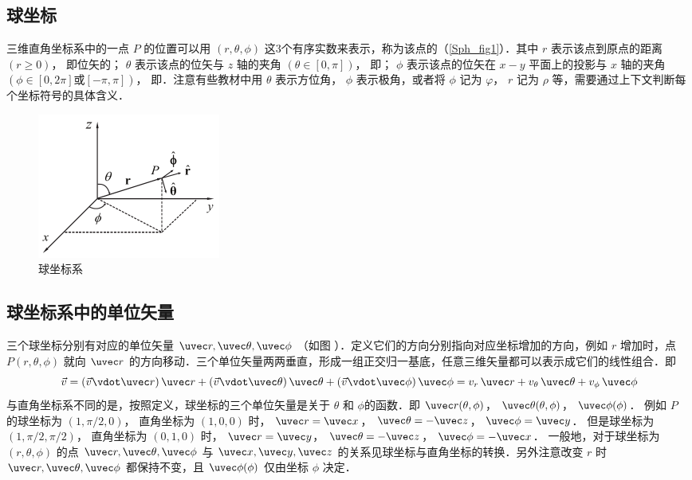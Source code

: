 

\subsection{球坐标}

三维直角坐标系中的一点 $P$ 的位置可以用 $(r,\theta ,\phi )$ 这3个有序实数来表示，称为该点的（\autoref{Sph_fig1}）．其中 $r$ 表示该点到原点的距离 $(r \ge 0)$， 即位矢的； $\theta$ 表示该点的位矢与 $z$ 轴的夹角 $(\theta  \in [0,\pi])$， 即； $\phi$ 表示该点的位矢在 $x - y$ 平面上的投影与 $x$ 轴的夹角 $(\phi  \in [0,2\pi]\text{或}[- \pi,\pi])$， 即．注意有些教材中用 $\theta $ 表示方位角， $\phi $ 表示极角，或者将 $\phi $ 记为 $\varphi $，  $r$ 记为 $\rho $ 等，需要通过上下文判断每个坐标符号的具体含义．

\begin{figure}[ht]
\centering
\includegraphics[width=6cm]{./figures/Sph.pdf}
\caption{球坐标系}\label{Sph_fig1}
\end{figure}

\subsection{球坐标系中的单位矢量}
三个球坐标分别有对应的单位矢量 $\uvec r, \uvec\theta, \uvec\phi$ （如图%
）．定义它们的方向分别指向对应坐标增加的方向，例如 $r$ 增加时，点 $P(r,\theta ,\phi )$ 就向 $\uvec r$ 的方向移动．三个单位矢量两两垂直，形成一组正交归一基底，任意三维矢量都可以表示成它们的线性组合．即
\begin{equation}
\vec v = (\vec v \vdot \uvec r)\,\uvec r + (\vec v \vdot \uvec \theta)\,\uvec \theta  + (\vec v \vdot \uvec \phi)\,\uvec \phi  = v_r \,\uvec r + v_\theta \,\uvec \theta  + v_\phi \,\uvec \phi 
\end{equation}
与直角坐标系不同的是，按照定义，球坐标的三个单位矢量是关于 $\theta$ 和 $\phi$的函数．即
$\uvec r(\theta ,\phi )$，  $\uvec \theta (\theta ,\phi )$，  $\uvec \phi (\phi )$． 
例如 $P$ 的球坐标为 $(1, \pi/2, 0)$， 直角坐标为 $(1, 0, 0)$ 时，
$\uvec r = \uvec x$， $\uvec \theta  =  - \uvec z$， $\uvec \phi  = \uvec y$． 
但是球坐标为 $(1, \pi/2, \pi/2)$， 直角坐标为 $(0, 1, 0)$ 时， $\uvec r = \uvec y$， $\uvec \theta  =  - \uvec z$， $\uvec \phi  =  - \uvec x$． 
一般地，对于球坐标为 $(r, \theta , \phi )$ 的点 $\uvec r, \uvec \theta, \uvec \phi$  与 $\uvec x, \uvec y, \uvec z$ 的关系见球坐标与直角坐标的转换．另外注意改变 $r$ 时 $\uvec r, \uvec \theta, \uvec \phi$ 都保持不变，且 $\uvec \phi (\phi )$ 仅由坐标 $\phi $ 决定．

